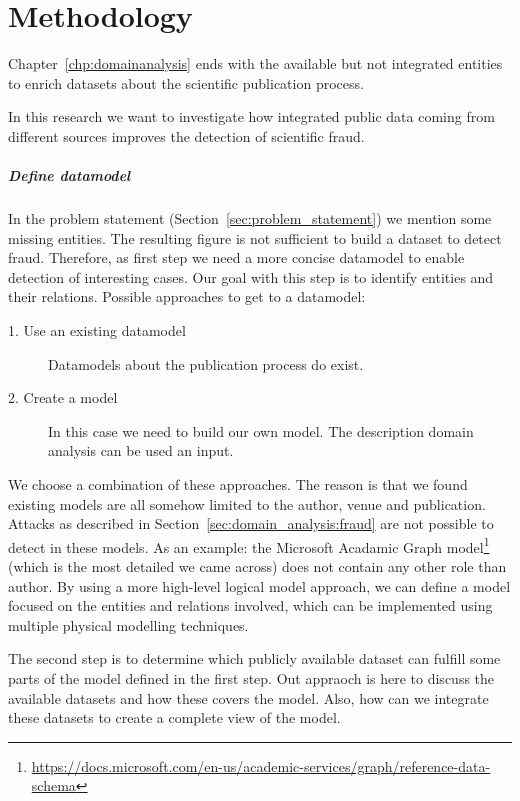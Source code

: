 \documentclass{ou-report}
\begin{document}
\chapter{Methodology}
\label{chp:methodology}

Chapter~\ref{chp:domainanalysis} ends with the available but not integrated 
entities to enrich datasets about the scientific publication process.

In this research we want to investigate 
how integrated public data coming from different sources improves the detection 
of scientific fraud.

\paragraph{Define datamodel}
In the problem statement (Section~\ref{sec:problem_statement}) we mention some 
missing entities. The resulting figure is not sufficient to build a dataset 
to detect fraud. Therefore, as first step we need a more concise datamodel to 
enable detection of interesting cases. Our goal with this step is to identify
entities and their relations.
Possible approaches to get to a datamodel:
\begin{description}
    \item[1. Use an existing datamodel] Datamodels about the publication process
    do exist.
    \item[2. Create a model] In this case we need to build our own model. The 
    description domain analysis can be used an input.
\end{description}

We choose a combination of these approaches. The reason is that we found 
existing models are all somehow limited to 
the author, venue and publication. Attacks as described in 
Section~\ref{sec:domain_analysis:fraud} are not possible to detect in 
these models. As an example: the Microsoft Acadamic Graph 
model\footnote{\url{https://docs.microsoft.com/en-us/academic-services/graph/reference-data-schema}} 
(which is the most detailed we came across) does not contain any other role 
than author.
By using a more high-level logical model approach, we can define a model 
focused on the entities and relations involved, which can be implemented 
using multiple physical modelling techniques. 

The second step is to determine which publicly available dataset can fulfill 
some parts of the model defined in the first step. Out appraoch is here to 
discuss the available datasets and how these covers the model. Also, how 
can we integrate these datasets to create a complete view of the model.
\end{document}
